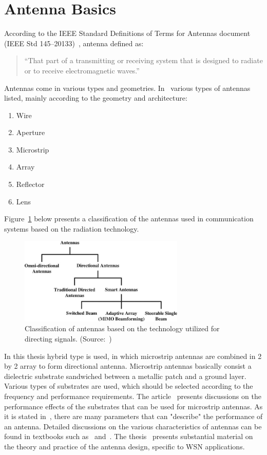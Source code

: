 \documentclass[12pt, oneandhalf, chaparabic, sees, ms]{metu}
\begin{document}
\section{Antenna Basics}\label{santbas}
According to the IEEE Standard Definitions of Terms for Antennas document (IEEE
Std 145–20133)~\cite{ieee2013}, antenna defined as: 
%
%
\begin{quote}
\enquote{That part of a transmitting or receiving system that is designed to radiate or to receive
electromagnetic waves.}
\end{quote}
\vspace{-5mm}
%
%
Antennas come in various types and geometries. In~\cite{balanis2016} various types of antennas listed, mainly according to the geometry and architecture:  
\begin{enumerate}
\setlength\itemsep{0em}
\item Wire 
\item Aperture
\item Microstrip
\item Array
\item Reflector
\item Lens
\end{enumerate}
%
Figure~\ref{fig:antennas} below presents a classification of the antennas used in communication systems based on the radiation technology.
% 
%
%
\begin{figure}[!htbp]
 \begin{center}
  \includegraphics[width=0.7\textwidth]{antennas.png}
 \end{center}
 \caption{Classification of antennas based on the technology utilized for directing signals. (Source:~\protect\cite{dai2011})}
  \label{fig:antennas}
\end{figure}
% 
%
%
%
\newpage
In this thesis hybrid type is used, in which microstrip antennas are combined in 2 by 2 array to form directional antenna. Microstrip antennas
basically consist a dielectric substrate sandwiched between a metallic patch and a ground layer. Various types of substrates are used, which should be
selected according to the frequency and performance requirements. The article~\cite{khan2012} presents discussions on the performance 
effects of the substrates that can be used for microstrip antennas.
As it is stated in~\cite[pp.~25-105]{balanis2016}, there are many parameters that 
can "describe" the performance of an antenna. Detailed discussions on the various characteristics of antennas can be found in textbooks such as~\cite{balanis2016} and~\cite{pozar2011}.
The thesis~\cite{whyte2008} presents substantial material on the theory and practice of the antenna design, specific to WSN applications.
\end{document}

